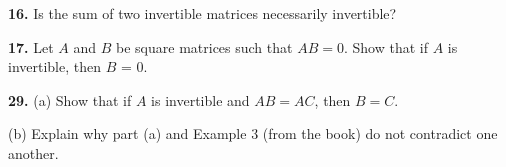 \documentclass[addpoints]{exam}
\begin{document}
\begin{questions}
    \question
    \textbf{16. } Is the sum of two invertible matrices necessarily invertible?
    \begin{solution}
        
    \end{solution}

    \question
    \textbf{17. } Let $A$ and $B$ be square matrices such that $ AB = 0 $. Show that if $A$ is invertible, then $B$ = 0. 
    \begin{solution}
        
    \end{solution}

    \question
    \textbf{29. } (a) Show that if $A$ is invertible and $ AB = AC $, then $ B = C $.


    \hspace{7.5mm} (b) Explain why part (a) and Example 3 (from the book) do not contradict one another.
    \begin{solution}
        
    \end{solution}

\end{questions}
\end{document}
